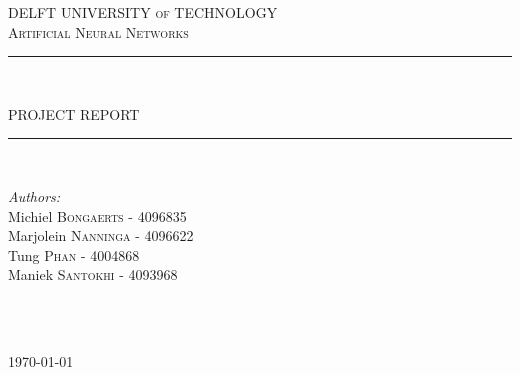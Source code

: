 \documentclass[a4paper,onecolumn]{report}
\begin{document}

\begin{titlepage}


\newcommand{\HRule}{\rule{\linewidth}{0.5mm}}
\newcommand{\horrule}[1]{\rule{\linewidth}{#1}}

\center %

\textsc{\small DELFT UNIVERSITY of TECHNOLOGY}\\[2.5cm] %

\textsc{\LARGE Artificial Neural Networks}\\[0.5cm] %

\HRule \\[0.1cm]
\begin{spacing}{1.6}
{ \huge PROJECT REPORT}\\[-0.4cm] %
\end{spacing}
\HRule \\[1.5cm]

\begin{minipage}{0.4\textwidth}
\begin{flushleft} \large
\emph{Authors:}\\
Michiel \textsc{Bongaerts} - 4096835\\
Marjolein \textsc{Nanninga} - 4096622\\
Tung \textsc{Phan} - 4004868\\
Maniek \textsc{Santokhi} - 4093968
\end{flushleft}

\end{minipage}
~
\begin{minipage}{0.4\textwidth}
\begin{flushright} \large
\end{flushright}
\end{minipage}\\[4cm]

{\large \today}\\[3cm]

\restoregeometry

\vfill

\end{titlepage}

\end{document}

